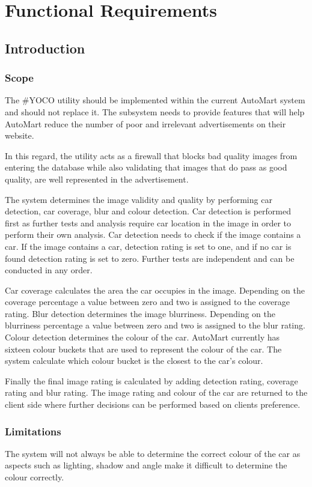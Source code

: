\section{Functional Requirements}
\subsection{Introduction}

\subsubsection{Scope}
The \#YOCO utility should be implemented within the current AutoMart system and should not replace it. The subsystem needs to provide features that will help AutoMart reduce the number of poor and irrelevant advertisements on their website.

In this regard, the utility acts as a firewall that blocks bad quality images from entering the database while also validating that images that do pass as good quality, are well represented in the advertisement.

The system determines the image validity and quality by performing car detection, car coverage, blur and colour detection. Car detection is performed first as further tests and analysis require car location in the image in order to perform their own analysis. Car detection needs to check if the image contains a car. If the image contains a car, detection rating is set to one, and if no car is found detection rating is set to zero. Further tests are independent and can be conducted in any order. 

Car coverage calculates the area the car occupies in the image. Depending on the coverage percentage a value between zero and two is assigned to the coverage rating. Blur detection determines the image blurriness. Depending on the blurriness percentage a value between zero and two is assigned to the blur rating. Colour detection determines the colour of the car. AutoMart currently has sixteen colour buckets that are used to represent the colour of the car. The system calculate which colour bucket is the closest to the car's colour.

Finally the final image rating is calculated by adding detection rating, coverage rating and blur rating. The image rating and colour of the car are returned to the client side where further decisions can be performed based on clients preference. 

\pagebreak
\subsubsection{Limitations}
The system will not always be able to determine the correct colour of the car as aspects such as lighting, shadow and angle make it difficult to determine the colour correctly.

